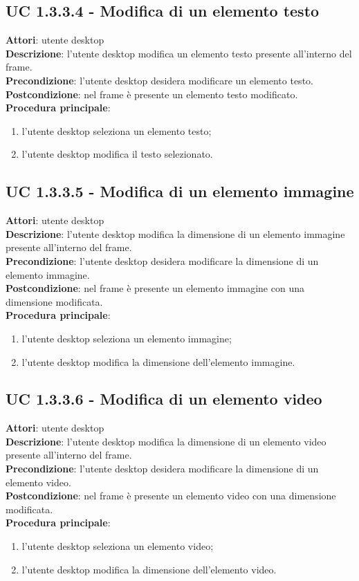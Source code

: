 \subsection{UC 1.3.3.4 - Modifica di un elemento testo}{
	\label{uc1.3.3.4}
	\textbf{Attori}: utente desktop \\
	\textbf{Descrizione}: l'utente desktop modifica un elemento testo presente all'interno del frame. \\
	\textbf{Precondizione}: l'utente desktop desidera modificare un elemento testo.	\\
	\textbf{Postcondizione}: nel frame è presente un elemento testo modificato.	\\
	\textbf{Procedura principale}:
	\begin{enumerate}
		\item l'utente desktop seleziona un elemento testo;
		\item l'utente desktop modifica il testo selezionato.
	\end{enumerate}
	}
\subsection{UC 1.3.3.5 - Modifica di un elemento immagine}{
	\label{uc1.3.3.5}
	\textbf{Attori}: utente desktop \\
	\textbf{Descrizione}: l'utente desktop modifica la dimensione di un elemento immagine presente all'interno del frame. \\
	\textbf{Precondizione}: l'utente desktop desidera modificare la dimensione di un elemento immagine.	\\
	\textbf{Postcondizione}: nel frame è presente un elemento immagine con una dimensione modificata.	\\
	\textbf{Procedura principale}:
	\begin{enumerate}
		\item l'utente desktop seleziona un elemento immagine;
		\item l'utente desktop modifica la dimensione dell'elemento immagine.
	\end{enumerate}
	}
\subsection{UC 1.3.3.6 - Modifica di un elemento video}{
	\label{uc1.3.3.6}
	\textbf{Attori}: utente desktop \\
	\textbf{Descrizione}: l'utente desktop modifica la dimensione di un elemento video presente all'interno del frame. \\
	\textbf{Precondizione}: l'utente desktop desidera modificare la dimensione di un elemento video.	\\
	\textbf{Postcondizione}: nel frame è presente un elemento video con una dimensione modificata.	\\
	\textbf{Procedura principale}:
	\begin{enumerate}
		\item l'utente desktop seleziona un elemento video;
		\item l'utente desktop modifica la dimensione dell'elemento video.
	\end{enumerate}
	}
